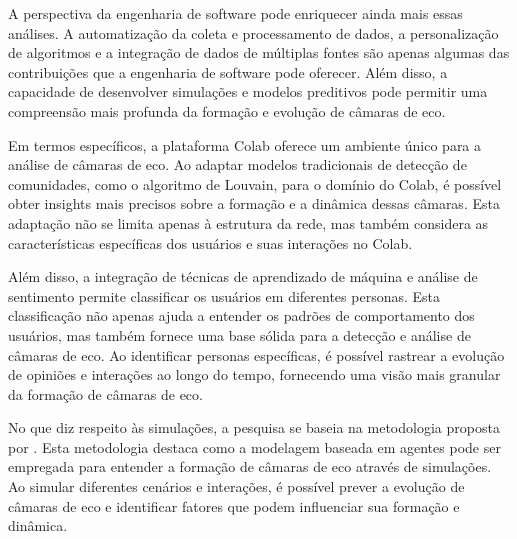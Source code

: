 A perspectiva da engenharia de software pode enriquecer ainda mais essas análises. A automatização da coleta e processamento de dados, a personalização de algoritmos e a integração de dados de múltiplas fontes são apenas algumas das contribuições que a engenharia de software pode oferecer. Além disso, a capacidade de desenvolver simulações e modelos preditivos pode permitir uma compreensão mais profunda da formação e evolução de câmaras de eco.

Em termos específicos, a plataforma Colab oferece um ambiente único para a análise de câmaras de eco. Ao adaptar modelos tradicionais de detecção de comunidades, como o algoritmo de Louvain, para o domínio do Colab, é possível obter insights mais precisos sobre a formação e a dinâmica dessas câmaras. Esta adaptação não se limita apenas à estrutura da rede, mas também considera as características específicas dos usuários e suas interações no Colab.

Além disso, a integração de técnicas de aprendizado de máquina e análise de sentimento permite classificar os usuários em diferentes personas. Esta classificação não apenas ajuda a entender os padrões de comportamento dos usuários, mas também fornece uma base sólida para a detecção e análise de câmaras de eco. Ao identificar personas específicas, é possível rastrear a evolução de opiniões e interações ao longo do tempo, fornecendo uma visão mais granular da formação de câmaras de eco.

No que diz respeito às simulações, a pesquisa se baseia na metodologia proposta por . Esta metodologia destaca como a modelagem baseada em agentes pode ser empregada para entender a formação de câmaras de eco através de simulações. Ao simular diferentes cenários e interações, é possível prever a evolução de câmaras de eco e identificar fatores que podem influenciar sua formação e dinâmica.